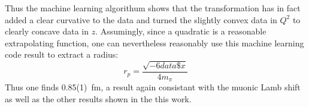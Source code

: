 \documentclass[10pt,aps,prc,twocolumn]{revtex4-1}
\begin{document}
\begin{appendix}
Thus the machine learning algorithum shows that the transformation
has in fact added a clear curvative to the data and turned the slightly
convex data in $Q^2$ to clearly concave data in $z$.
Assumingly, since a quadratic is a reasonable extrapolating function, one can
nevertheless reasonably use this machine learning code result to extract a radius:
\begin{equation}
r_p = \frac{\sqrt{-6data\$x}}{4 m_{\pi}}
\end{equation}
Thus one finds 0.85(1)~fm,  a result again consistant with the muonic Lamb shift
as well as the other results shown in the this work.

\end{appendix}


\end{document}

